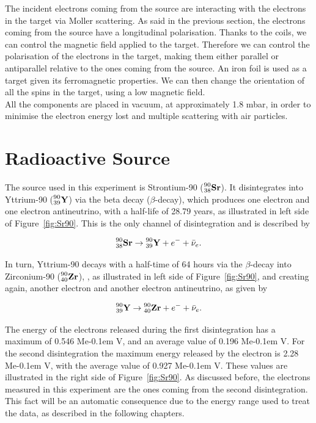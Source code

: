 \documentclass[10pt,swedish, openany]{book}
\def\MeV{\ifmmode {\mathrm{\ Me\kern -0.1em V}}\else
                   \textrm{Me\kern -0.1em V}\fi}%
\begin{document}
The incident electrons coming from the source are interacting with the electrons in the target via Moller scattering. As said in the previous section, the electrons coming from the source have a longitudinal polarisation. Thanks to the coils, we can control the magnetic field applied to the target. Therefore we can control the polarisation of the electrons in the target, making them either parallel or antiparallel relative to the ones coming from the source. An iron foil is used as a target given its ferromagnetic properties. We can then change the orientation of all the spins in the target, using a low magnetic field. \\

All the components are placed in vacuum, at approximately 1.8 mbar, in order to minimise the electron energy lost and multiple scattering with air particles.

\section{Radioactive Source}

The source used in this experiment is Strontium-90 ($\prescript{90}{38}{\mathbf{Sr}}$). It disintegrates into Yttrium-90 ($\prescript{90}{39}{\mathbf{Y}}$) via the beta decay ($\beta$-decay), which produces one electron and one electron antineutrino, with a half-life of 28.79 years, as illustrated in left side of Figure~\ref{fig:Sr90}. This is the only channel of disintegration and is described by

 \begin{equation}
     \prescript{90}{38}{\mathbf{Sr}} \rightarrow \prescript{90}{39}{\mathbf{Y}} + e^- +\bar{\nu}_e.
 \end{equation}
 
In turn, Yttrium-90 decays with a half-time of 64 hours via the $\beta$-decay into Zirconium-90 ($\prescript{90}{40}{\mathbf{Zr}}$), , as illustrated in left side of Figure~\ref{fig:Sr90}, and creating again, another electron and another electron antineutrino, as given by
 
\begin{equation}
     \prescript{90}{39}{\mathbf{Y}} \rightarrow \prescript{90}{40}{\mathbf{Zr}} + e^- +\bar{\nu}_e .
 \end{equation}

The energy of the electrons released during the first disintegration has a maximum of  0.546 \MeV, and an average value of 0.196 \MeV. For the second disintegration the maximum energy released by the electron is 2.28 \MeV, with the average value of 0.927 \MeV. These values are illustrated in the right side of Figure~\ref{fig:Sr90}. As discussed before, the electrons measured in this experiment are the ones coming from the second disintegration. This fact will be an automatic consequence due to the energy range used to treat the data, as described in the following chapters.
\end{document}
